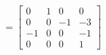 \documentclass[preview]{standalone}
\begin{document}
\begin{center}
$ = \begin{bmatrix}0 & 1 & 0 & 0 \\ 0 & 0 & -1 & -3 \\ -1 & 0 & 0 & -1\\ 0 & 0 & 0 & 1\end{bmatrix}$
\end{center}
\end{document}
